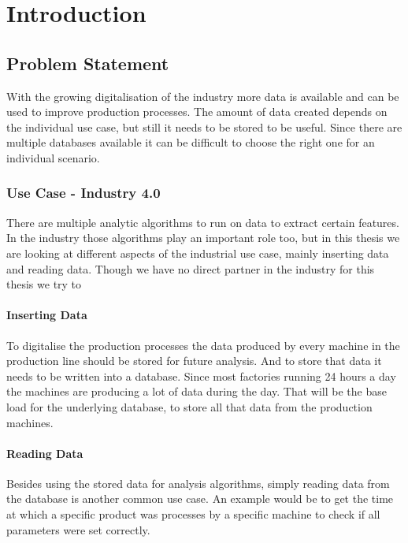 \chapter{Introduction}
\label{ch:introduction}

\section{Problem Statement}
With the growing digitalisation of the industry more data is available and can be used to improve production processes.
The amount of data created depends on the individual use case,
but still it needs to be stored to be useful.
Since there are multiple databases available it can be difficult to choose the right one for an individual scenario.

\subsection{Use Case - Industry 4.0}
There are multiple analytic algorithms to run on data to extract certain features.
In the industry those algorithms play an important role too,
but in this thesis we are looking at different aspects of the industrial use case,
mainly inserting data and reading data.
Though we have no direct partner in the industry for this thesis we try to 

\subsubsection{Inserting Data}
To digitalise the production processes the data produced by every machine in the production line should be stored for future analysis.
And to store that data it needs to be written into a database.
Since most factories running 24 hours a day the machines are producing a lot of data during the day.
That will be the base load for the underlying database, to store all that data from the production machines.

\subsubsection{Reading Data}
Besides using the stored data for analysis algorithms,
simply reading data from the database is another common use case.
An example would be to get the time at which a specific product was processes by a specific machine to check if all parameters were set correctly.

